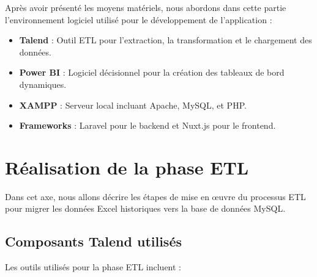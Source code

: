 Après avoir présenté les moyens matériels, nous abordons dans cette partie l’environnement logiciel utilisé pour le développement de l’application :

\begin{itemize}
    \item \textbf{Talend} : Outil ETL pour l'extraction, la transformation et le chargement des données.
    \item \textbf{Power BI} : Logiciel décisionnel pour la création des tableaux de bord dynamiques.
    \item \textbf{XAMPP} : Serveur local incluant Apache, MySQL, et PHP.
    \item \textbf{Frameworks} : Laravel pour le backend et Nuxt.js pour le frontend.
\end{itemize}

\section{Réalisation de la phase ETL}

Dans cet axe, nous allons décrire les étapes de mise en œuvre du processus ETL pour migrer les données Excel historiques vers la base de données MySQL.
\subsection{Composants Talend utilisés}

Les outils utilisés pour la phase ETL incluent :

